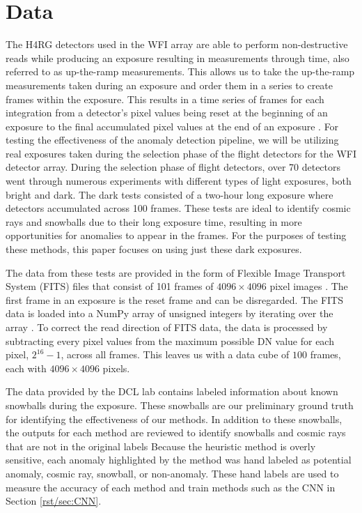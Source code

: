 \section{Data}
\label{rst/sec:data}
The H4RG detectors used in the WFI array are able to perform non-destructive reads while producing an exposure resulting in measurements through time, also referred to as up-the-ramp measurements. 
This allows us to take the up-the-ramp measurements taken during an exposure and order them in a series to create frames within the exposure. 
This results in a time series of frames for each integration from a detector's pixel values being reset at the beginning of an exposure to the final accumulated pixel values at the end of an exposure \parencite{casertano2022determining}.
For testing the effectiveness of the anomaly detection pipeline, we will be utilizing real exposures taken during the selection phase of the flight detectors for the WFI detector array. 
During the selection phase of flight detectors, over 70 detectors went through numerous experiments with different types of light exposures, both bright and dark.
The dark tests consisted of a two-hour long exposure where detectors accumulated across 100 frames.
These tests are ideal to identify cosmic rays and snowballs due to their long exposure time, resulting in more opportunities for anomalies to appear in the frames. 
For the purposes of testing these methods, this paper focuses on using just these dark exposures. 

The data from these tests are provided in the form of Flexible Image Transport System (FITS) files that consist of 101 frames of $4096 \times 4096$ pixel images \parencite{wells1979fits}.
The first frame in an exposure is the reset frame and can be disregarded. 
The FITS data is loaded into a NumPy array of unsigned integers by iterating over the array \parencite{harris2020array}.
To correct the read direction of FITS data, the data is processed by subtracting every pixel values from the maximum possible DN value for each pixel, $2^{16} - 1$, across all frames.
This leaves us with a data cube of $100$ frames, each with $4096 \times 4096$ pixels. 

The data provided by the DCL lab contains labeled information about known snowballs during the exposure. 
These snowballs are our preliminary ground truth for identifying the effectiveness of our methods. 
In addition to these snowballs, the outputs for each method are reviewed to identify snowballs and cosmic rays that are not in the original labels
Because the heuristic method is overly sensitive, each anomaly highlighted by the method was hand labeled as potential anomaly, cosmic ray, snowball, or non-anomaly. 
These hand labels are used to measure the accuracy of each method and train methods such as the CNN in Section \ref{rst/sec:CNN}.

